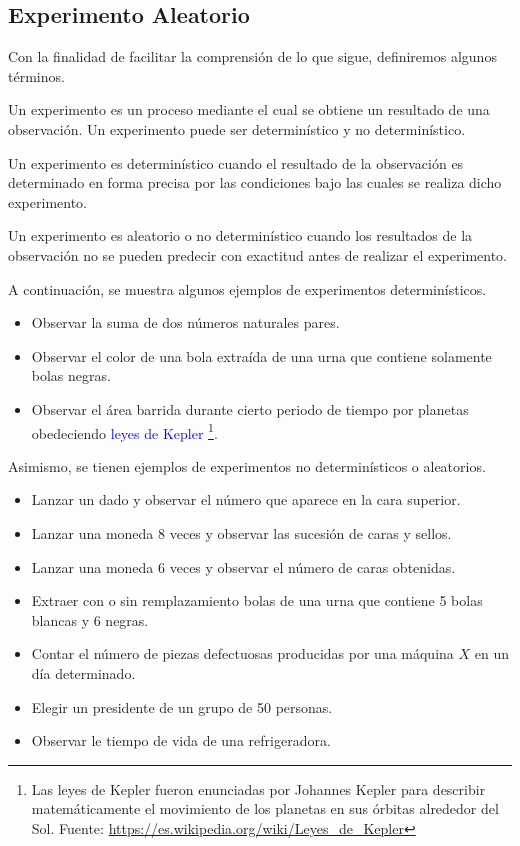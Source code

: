     \subsection{Experimento Aleatorio}
    Con la finalidad de facilitar la comprensión de lo que sigue, definiremos algunos términos.
        \begin{defi}
            Un experimento es un proceso mediante el cual se obtiene un resultado 
            de una observación. Un experimento puede ser determinístico y no determinístico.
        \end{defi}
        \begin{defi}
            Un experimento es determinístico cuando el resultado de la
            observación es determinado en forma precisa por las condiciones 
            bajo las cuales se realiza dicho experimento.
        \end{defi}
        \begin{defi}
            Un experimento es aleatorio o no determinístico cuando los resultados 
            de la observación no se pueden predecir con exactitud antes de realizar
            el experimento.
        \end{defi}
    A continuación, se muestra algunos ejemplos de experimentos determinísticos.
        \begin{itemize}
            \item Observar la suma de dos números naturales pares.
            \item Observar el color de una bola extraída de una urna que contiene solamente bolas negras.
            \item Observar el área barrida durante cierto periodo de tiempo por planetas obedeciendo \textcolor{blue}{leyes de Kepler} \footnote{Las leyes de Kepler fueron enunciadas por Johannes Kepler para describir matemáticamente el movimiento de los planetas en sus órbitas alrededor del Sol. Fuente: \textcolor{red!75}{\url{https://es.wikipedia.org/wiki/Leyes_de_Kepler}}}.
        \end{itemize}
    Asimismo, se tienen ejemplos de experimentos no determinísticos o aleatorios.
        \begin{itemize}
            \item Lanzar un dado y observar el número que aparece en la cara superior.
            \item Lanzar una moneda 8 veces y observar las sucesión de caras y sellos.
            \item Lanzar una moneda 6 veces y observar el número de caras obtenidas.
            \item Extraer con o sin remplazamiento bolas de una urna que contiene 5 bolas blancas y 6 negras.
            \item Contar el número de piezas defectuosas producidas por una máquina $X$ en un día determinado.
            \item Elegir un presidente de un grupo de 50 personas.
            \item Observar le tiempo de vida de una refrigeradora.
        \end{itemize}
